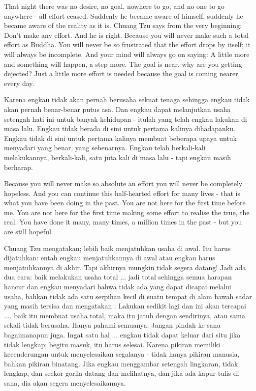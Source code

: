 \english
That night there was no desire, no goal, nowhere to go, and no one to go anywhere - all effort ceased. Suddenly he became aware of himself, suddenly he became aware of the reality as it is. Chuang Tzu says from the very beginning: Don't make any effort. And he is right. Because you will never make such a total effort as Buddha. You will never be so frustrated that the effort drops by itself; it will always be incomplete. And your mind will always go on saying: A little more and something will happen, a step more. The goal is near, why are you getting dejected? Just a little more effort is needed because the goal is coming nearer every day.

\bahasa
Karena engkau tidak akan pernah berusaha sekuat tenaga sehingga engkau tidak akan pernah benar-benar putus asa. Dan engkau dapat melanjutkan usaha setengah hati ini untuk banyak kehidupan - itulah yang telah engkau lakukan di masa lalu. Engkau tidak berada di sini untuk pertama kalinya dihadapanku. Engkau tidak di sini untuk pertama kalinya membuat beberapa upaya untuk menyadari yang benar, yang sebenarnya. Engkau telah berkali-kali melakukannya, berkali-kali, satu juta kali di masa lalu - tapi engkau masih berharap.

\english
Because you will never make so absolute an effort you will never be completely hopeless. And you can continue this half-hearted effort for many lives - that is what you have been doing in the past. You are not here for the first time before me. You are not here for the first time making some effort to realise the true, the real. You have done it many, many times, a million times in the past - but you are still hopeful.

\bahasa
Chuang Tzu mengatakan; lebih baik menjatuhkan usaha di awal. Itu harus dijatuhkan: entah engkau menjatuhkannya di awal atau engkau harus menjatuhkannya di akhir. Tapi akhirnya mungkin tidak segera datang! Jadi ada dua cara: baik melakukan usaha total ... jadi total sehingga semua harapan hancur dan engkau menyadari bahwa tidak ada yang dapat dicapai melalui usaha, bahkan tidak ada satu serpihan kecil di suatu tempat di alam bawah sadar yang masih tersisa dan mengatakan : Lakukan sedikit lagi dan ini akan tercapai .... baik itu membuat usaha total, maka itu jatuh dengan sendirinya, atau sama sekali tidak berusaha. Hanya pahami semuanya. Jangan pindah ke sana bagaimanapun juga. Ingat satu hal ... engkau tidak dapat keluar dari situ jika tidak lengkap; begitu masuk, itu harus selesai. Karena pikiran memiliki kecenderungan untuk menyelesaikan segalanya - tidak hanya pikiran manusia, bahkan pikiran binatang. Jika engkau menggambar setengah lingkaran, tidak lengkap, dan seekor gorila datang dan melihatnya, dan jika ada kapur tulis di sana, dia akan segera menyelesaikannya.

